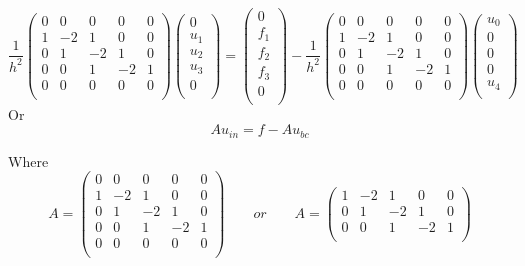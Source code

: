 \documentclass[11pt]{article}
\begin{document}
\begin{equation}
\frac{1}{h^2}
 \begin{pmatrix}
  0 &  0 &  0 &  0 &  0 \\
  1 & -2 &  1 &  0 &  0 \\
  0 &  1 & -2 &  1 &  0 \\
  0 &  0 &  1 & -2 &  1 \\
  0 &  0 &  0 &  0 &  0 \\
 \end{pmatrix}
 \begin{pmatrix}
  0 \\  u_1 \\  u_2 \\  u_3 \\  0 \\
 \end{pmatrix}
  = 
 \begin{pmatrix}
  0 \\  f_1 \\  f_2 \\  f_3 \\  0 \\
 \end{pmatrix}
   -
\frac{1}{h^2}
 \begin{pmatrix}
  0 &  0 &  0 &  0 &  0 \\
  1 & -2 &  1 &  0 &  0 \\
  0 &  1 & -2 &  1 &  0 \\
  0 &  0 &  1 & -2 &  1 \\
  0 &  0 &  0 &  0 &  0 \\
 \end{pmatrix}
 \begin{pmatrix}
  u_0 \\  0 \\  0 \\  0 \\  u_4 \\
 \end{pmatrix}
\end{equation}
Or
\begin{equation}
Au_{in} = f - Au_{bc}
\end{equation}

Where
\begin{equation}
A = 
 \begin{pmatrix}
  0 &  0 &  0 &  0 &  0 \\
  1 & -2 &  1 &  0 &  0 \\
  0 &  1 & -2 &  1 &  0 \\
  0 &  0 &  1 & -2 &  1 \\
  0 &  0 &  0 &  0 &  0 \\
 \end{pmatrix}
 \qquad or \qquad
A = 
 \begin{pmatrix}
  1 & -2 &  1 &  0 &  0 \\
  0 &  1 & -2 &  1 &  0 \\
  0 &  0 &  1 & -2 &  1 \\
 \end{pmatrix}
\end{equation}
\end{document}
